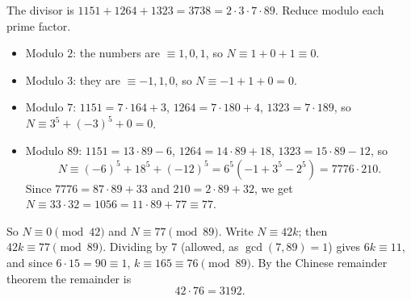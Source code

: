 The divisor is $1151+1264+1323=3738=2\cdot3\cdot7\cdot89$. Reduce modulo each prime factor.
\begin{itemize}
\item Modulo $2$: the numbers are $\equiv1,0,1$, so $N\equiv1+0+1\equiv0$.
\item Modulo $3$: they are $\equiv-1,1,0$, so $N\equiv-1+1+0=0$.
\item Modulo $7$: $1151=7\cdot164+3$, $1264=7\cdot180+4$, $1323=7\cdot189$, so $N\equiv3^5+(-3)^5+0=0$.
\item Modulo $89$: $1151=13\cdot89-6$, $1264=14\cdot89+18$, $1323=15\cdot89-12$, so
\[
N\equiv(-6)^5+18^5+(-12)^5=6^5\left(-1+3^5-2^5\right)=7776\cdot210 .
\]
Since $7776=87\cdot89+33$ and $210=2\cdot89+32$, we get $N\equiv33\cdot32=1056=11\cdot89+77\equiv77$.
\end{itemize}
So $N\equiv0\pmod{42}$ and $N\equiv77\pmod{89}$. Write $N\equiv42k$; then $42k\equiv77\pmod{89}$. Dividing by $7$ (allowed, as $\gcd(7,89)=1$) gives $6k\equiv11$, and since $6\cdot15=90\equiv1$, $k\equiv165\equiv76\pmod{89}$. By the Chinese remainder theorem the remainder is
\[
42\cdot76=\boxed{3192}.
\]
